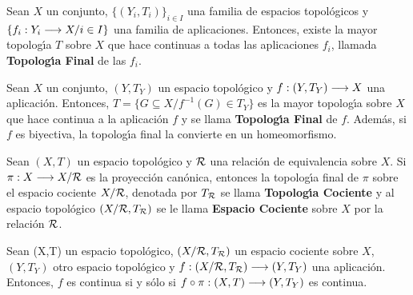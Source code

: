 \documentclass[cursovd_portada.tex]{subfiles}
\begin{document}
\begin{prop}
Sean $X$ un conjunto, $\{(Y_i,T_i)\}_{i\in I}$ una familia de espacios topol\'{o}gicos y $\{f_i:Y_i\longrightarrow X/i\in I\}$ una
familia de aplicaciones. Entonces, existe la mayor topolog\'{\i}a $T$ sobre $X$ que hace continuas a todas las
aplicaciones $f_i$, llamada {\bf Topolog\'{\i}a Final} de las $f_i$.
\end{prop}
\begin{coro}
Sean $X$ un conjunto, $(Y,T_Y)$ un espacio topol\'{o}gico y $f:(Y,T_Y)\longrightarrow X$ una aplicaci\'{o}n. Entonces, $T=\{G\subseteq
X/ f^{-1}(G)\in T_Y\}$ es la mayor topolog\'{\i}a sobre $X$ que hace continua a la aplicaci\'{o}n $f$ y se llama {\bf
Topolog\'{\i}a Final} de $f$. Adem\'{a}s, si $f$ es biyectiva, la topolog\'{\i}a final la convierte en un homeomorfismo.
\end{coro}
\begin{defi}
Sean $(X,T)$ un espacio topol\'{o}gico y ${\cal R}$ una relaci\'{o}n de equivalencia sobre $X$. Si $\pi:X\longrightarrow X/{\cal R}$ es
la proyecci\'{o}n can\'{o}nica, entonces la topolog\'{\i}a final de $\pi$ sobre el espacio cociente $X/{\cal R}$, denotada por
$T_{{\cal R}}$ se llama {\bf Topolog\'{\i}a Cociente} y al espacio topol\'{o}gico $(X/{\cal R},T_{{\cal R}})$ se le llama {\bf
Espacio Cociente} sobre $X$ por la relaci\'{o}n ${\cal R}$.
\end{defi}
\begin{prop}
Sean (X,T) un espacio topol\'{o}gico, $(X/{\cal R},T_{{\cal R}})$ un espacio cociente sobre $X$, $(Y,T_Y)$ otro espacio
topol\'{o}gico y $f:(X/{\cal R},T_{{\cal R}})\longrightarrow (Y,T_Y)$ una aplicaci\'{o}n. Entonces, $f$ es continua si y s\'{o}lo si
$f\circ\pi:(X,T)\longrightarrow (Y,T_Y)$ es continua.
\end{prop}
\end{document}
